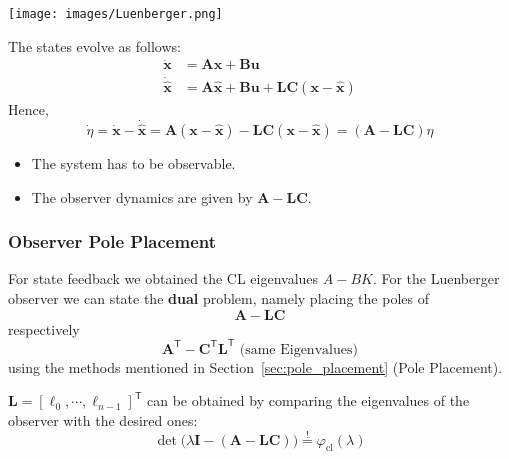 \begin{center}
    \texttt{[image: images/Luenberger.png]}
\end{center}

\newpar{}


The states evolve as follows:
\begin{align*}
    \dot{\mathbf{x}}       & =\mathbf{Ax}+\mathbf{Bu}                                                         \\
    \dot{\hat{\textbf{x}}} & =\mathbf{A}\hat{\mathbf{x}}+\mathbf{Bu}+\mathbf{LC}(\mathbf{x}-\hat{\mathbf{x}})
\end{align*}
Hence,
\begin{equation*}
    \dot{\eta}=\dot{\mathbf{x}}-\dot{\hat{\textbf{x}}}=\mathbf{A}(\mathbf{x}-\hat{\mathbf{x}})-\mathbf{LC}(\mathbf{x}-\hat{\mathbf{x}})=(\mathbf{A}-\mathbf{LC})\eta
\end{equation*}


\begin{itemize}
    \item The system has to be observable.
    \item The observer dynamics are given by $\mathbf{A}-\mathbf{LC}$.
\end{itemize}

\subsubsection{Observer Pole Placement}
For state feedback we obtained the CL eigenvalues $A-BK$.
For the Luenberger observer we can state the \textbf{dual} problem, namely placing the poles of
\begin{equation*}
    \mathbf{A}-\mathbf{LC}
\end{equation*}
respectively
\begin{equation*}
    \mathbf{A}^{\mathsf{T}}-\mathbf{C}^{\mathsf{T}} \mathbf{L}^{\mathsf{T}}\text{ (same Eigenvalues)}
\end{equation*}
using the methods mentioned in Section\ \ref{sec:pole_placement} (Pole Placement).

\newpar{}

$\mathbf{L}={\left[\ell_0,\cdots,\ell_{n-1}\right]}^{\mathsf{T}}$ can be obtained by comparing the eigenvalues of the observer with the desired ones:
\noindent\begin{equation*}
    \det\bigl(\lambda \mathbf{I} -(\mathbf{A}-\mathbf{LC})\bigr) \overset{!}{=} \varphi_{\mathrm{cl}}(\lambda)
\end{equation*}

